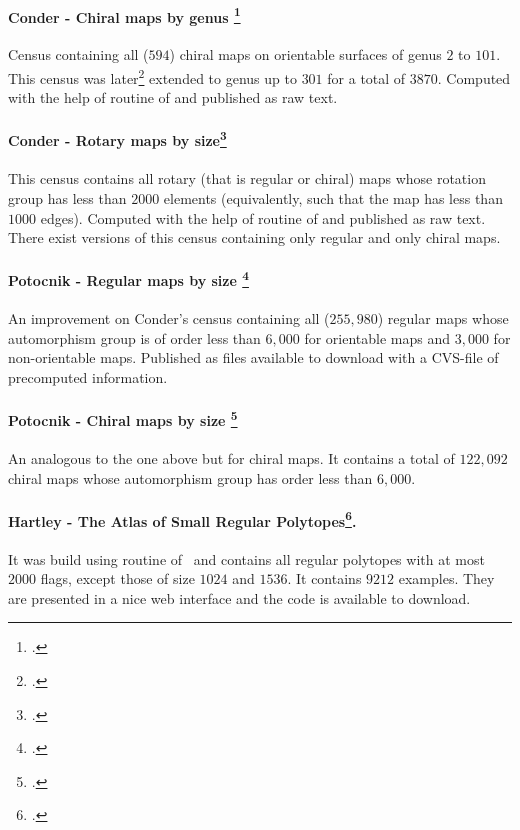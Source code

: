 \paragraph{Conder - Chiral maps by genus \footcite{Conder_2006_ChiralOrientablyRegular}} Census containing all ($594$) chiral maps on orientable surfaces of genus $2$ to $101$. This census was later\footcite{Conder_2013_ChiralRotaryMaps} extended to genus up to $301$ for a total of $3870$.
Computed with the help of \lins routine of \magma and published as raw text.
%
\paragraph{Conder - Rotary maps by size\footcite{Conder_2012_RotaryMapsOn} } This census contains all rotary (that is regular or chiral) maps whose rotation group has less than $2000$ elements (equivalently, such that the map has less than $1000$ edges).
Computed with the help of \lins routine of \magma and published as raw text. There exist versions of this census containing only regular and only chiral maps.
%
\paragraph{Potocnik - Regular maps by size \footcite{Potocnik_2014_CensusRegularMaps}} An improvement on Conder's census containing all ($255,980$) regular maps whose automorphism group is of order less than $6,000$ for orientable maps and $3,000$ for non-orientable maps. Published as \magma files available to download with a CVS-file of precomputed information.
%
\paragraph{Potocnik - Chiral maps by size \footcite{Potocnik_2014_CensusChiralMaps}} An analogous to the one above but for chiral maps. It contains a total of $122,092$ chiral maps whose automorphism group has order less than $6,000$.

\paragraph{Hartley - The Atlas of Small Regular Polytopes\footcite{Hartley_2006_AtlasSmallRegular}.} It was build using \smallgrp routine of \gap\ and contains all regular polytopes with at most $2000$ flags, except those of size $1024$ and $1536$. It contains $9212$ examples. They are presented in a nice web interface and the code is available to download.

